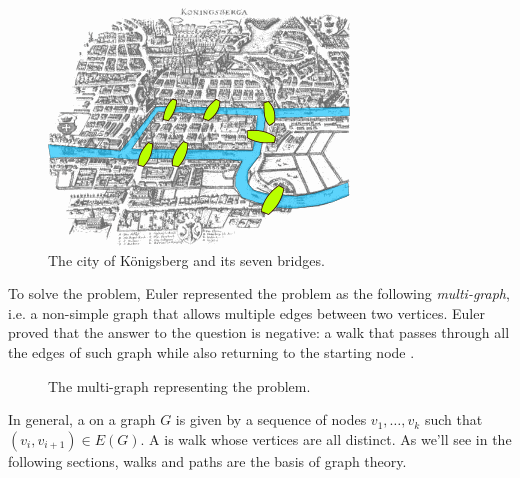 \documentclass[a4paper, 12pt]{report}
\begin{document}
    \begin{figure}[H]
        \centering

        \includegraphics[scale=0.6]{../assets/Konigsberg_bridges.png}
        \caption{The city of Königsberg and its seven bridges.}
    \end{figure}

    To solve the problem, Euler represented the problem as the following \textit{multi-graph}, i.e. a non-simple graph that allows multiple edges between two vertices. Euler proved that the answer to the question is negative: a walk that passes through all the edges of such graph while also returning to the starting node .

    \begin{figure}[H]
        \centering

        \caption{The multi-graph representing the  problem.}
    \end{figure}

    In general, a  on a graph $G$ is given by a sequence of nodes $v_1, \ldots, v_k$ such that $(v_i, v_{i+1}) \in E(G)$. A  is walk whose vertices are all distinct. As we'll see in the following sections, walks and paths are the basis of graph theory.
\end{document}
